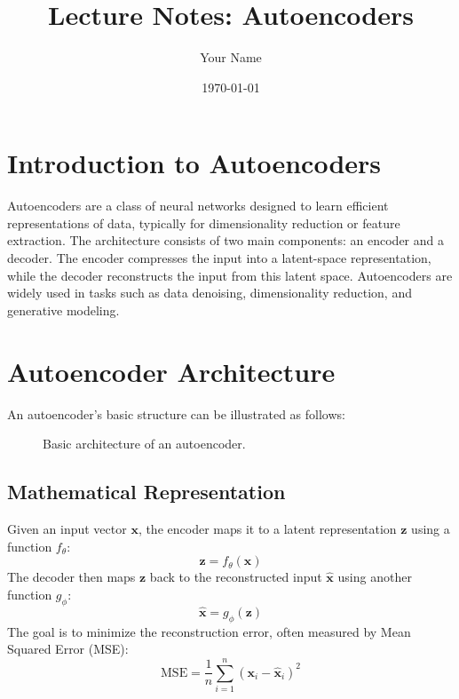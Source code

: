 \documentclass{article}
\title{Lecture Notes: Autoencoders}
\author{Your Name}
\date{\today}
\begin{document}
\maketitle

\section{Introduction to Autoencoders}

Autoencoders are a class of neural networks designed to learn efficient representations of data, typically for dimensionality reduction or feature extraction. The architecture consists of two main components: an encoder and a decoder. The encoder compresses the input into a latent-space representation, while the decoder reconstructs the input from this latent space. Autoencoders are widely used in tasks such as data denoising, dimensionality reduction, and generative modeling.

\section{Autoencoder Architecture}

An autoencoder's basic structure can be illustrated as follows:

\begin{figure}[h]
    \centering
    \caption{Basic architecture of an autoencoder.}
    \label{fig:autoencoder}
\end{figure}

\subsection{Mathematical Representation}

Given an input vector \( \mathbf{x} \), the encoder maps it to a latent representation \( \mathbf{z} \) using a function \( f_\theta \):
\[
\mathbf{z} = f_\theta(\mathbf{x})
\]
The decoder then maps \( \mathbf{z} \) back to the reconstructed input \( \mathbf{\hat{x}} \) using another function \( g_\phi \):
\[
\mathbf{\hat{x}} = g_\phi(\mathbf{z})
\]
The goal is to minimize the reconstruction error, often measured by Mean Squared Error (MSE):
\[
\text{MSE} = \frac{1}{n} \sum_{i=1}^{n} (\mathbf{x}_i - \mathbf{\hat{x}}_i)^2
\]
\end{document}
